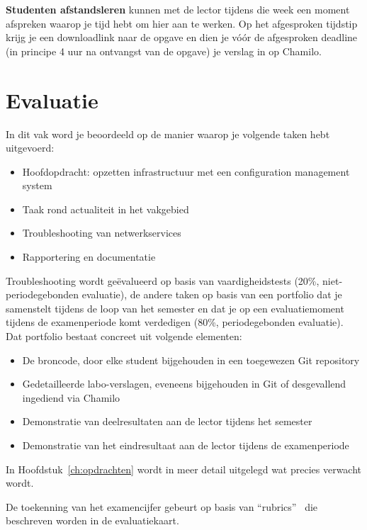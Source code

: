 \textbf{Studenten afstandsleren} kunnen met de lector tijdens die week een moment afspreken waarop je tijd hebt om hier aan te werken. Op het afgesproken tijdstip krijg je een downloadlink naar de opgave en dien je vóór de afgesproken deadline (in principe 4 uur na ontvangst van de opgave) je verslag in op Chamilo.

\section{Evaluatie}
\label{sec:evaluatie}

In dit vak word je beoordeeld op de manier waarop je volgende taken hebt uitgevoerd:

\begin{itemize}
  \item Hoofdopdracht: opzetten infrastructuur met een configuration management system
  \item Taak rond actualiteit in het vakgebied
  \item Troubleshooting van netwerkservices
  \item Rapportering en documentatie
\end{itemize}

Troubleshooting wordt geëvalueerd op basis van vaardigheidstests (20\%, niet-periodegebonden evaluatie), de andere taken op basis van een portfolio dat je samenstelt tijdens de loop van het semester en dat je op een evaluatiemoment tijdens de examenperiode komt verdedigen (80\%, periodegebonden evaluatie). Dat portfolio bestaat concreet uit volgende elementen:

\begin{itemize}
  \item De broncode, door elke student bijgehouden in een toegewezen Git repository
  \item Gedetailleerde labo-verslagen, eveneens bijgehouden in Git of desgevallend ingediend via Chamilo
  \item Demonstratie van deelresultaten aan de lector tijdens het semester
  \item Demonstratie van het eindresultaat aan de lector tijdens de examenperiode
\end{itemize}

In Hoofdstuk~\ref{ch:opdrachten} wordt in meer detail uitgelegd wat precies verwacht wordt.

De toekenning van het examencijfer gebeurt op basis van ``rubrics''~\autocite{Andrade2000} die beschreven worden in de evaluatiekaart.

